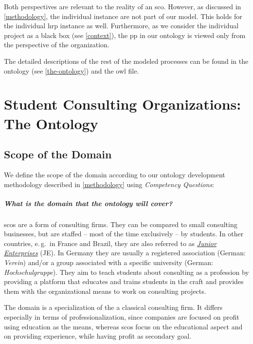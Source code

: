 \documentclass[a4paper, DIV=13, BCOR=0cm]{scrbook}
\newcommand{\eg}{e.\,g.\ }
\begin{document}
Both perspectives are relevant to the reality of an \gls{sco}. However, as discussed in \autoref{methodology}, the individual instance are not part of our model. This holds for the individual \gls{hrp} instance as well. Furthermore, as we consider the individual project as a black box (see \autoref{context}), the \gls{pp} in our ontology is viewed only from the perspective of the organization.

The detailed descriptions of the rest of the modeled processes can be found in the ontology (see \autoref{the-ontology}) and the \gls{owl} file.

\chapter{Student Consulting Organizations: The Ontology }
\label{the-ontology}
\section{Scope of the Domain }
\label{competency-questions}
We define the scope of the domain according to our ontology development methodology described in \autoref{methodology} using \textit{Competency Questions}:

\paragraph{What is the domain that the ontology will cover?}
\glspl{sco} are a form of consulting firms.  They can be compared to small consulting businesses, but are staffed -- most of the time exclusively -- by students. In other countries, \eg in France and Brazil, they are also referred to as \href{https://en.wikipedia.org/wiki/Junior_enterprise}{\textit{Junior Enterprises}} (JE). In Germany they are usually a registered association (German: \textit{Verein}) and/or a group associated with a specific university (German: \textit{Hochschulgruppe}). They aim to teach students about consulting as a profession by providing a platform that educates and trains students in the craft and provides them with the organizational means to work on consulting projects.

The domain is a specialization of the a classical consulting firm. It differs especially in terms of professionalization, since companies are focused on profit using education as the means, whereas \glspl{sco} focus on the educational aspect and on providing experience, while having profit as secondary goal.
\end{document}
